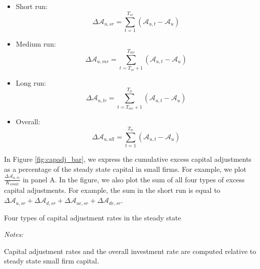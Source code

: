\documentclass[11pt,english]{article}
\newcommand*{\TabDir}{../tables}
\begin{document}
\begin{itemize}
\item Short run:
\begin{equation*}
\Delta \mathcal{A}_{u,sr} = \sum_{t=1}^{T_{sr}} \left( \mathcal{A}_{u,t} -  \mathcal{A}_{u}  \right)
\end{equation*}
\item Medium run:
\begin{equation*}
\Delta \mathcal{A}_{u,mr} = \sum_{t=T_{sr}+1}^{T_{mr}} \left( \mathcal{A}_{u,t} -  \mathcal{A}_{u}  \right)
\end{equation*}
\item Long run:
\begin{equation*}
\Delta \mathcal{A}_{u,lr} = \sum_{t=T_{mr}+1}^{T_{lr}} \left( \mathcal{A}_{u,t} -  \mathcal{A}_{u}  \right)
\end{equation*}
\item Overall:
\begin{equation*}
\Delta \mathcal{A}_{u,all} = \sum_{t=1}^{T_{lr}} \left( \mathcal{A}_{u,t} -  \mathcal{A}_{u}  \right)
\end{equation*}
\end{itemize}
In Figure \ref{fig:capadj_bar}, we express the cumulative excess capital adjustments as a percentage of the steady state capital in small firms. For example, we plot $\frac{\Delta \mathcal{A}_{u,sr}}{K_{small}}$ in panel A. In the figure, we also plot the sum of all four types of excess capital adjustments. For example, the sum in the short run is equal to $\Delta \mathcal{A}_{u,sr} + \Delta \mathcal{A}_{d,sr} +\Delta \mathcal{A}_{ue,sr} +\Delta \mathcal{A}_{de,sr}$.

\begin{table}[htbp]
	\caption{Four types of capital adjustment rates in the steady state}
   	\label{tab:capadj_ss}
   	\centering
   	
   	\vspace{1ex}
   	
   	{\textit{Notes:} \raggedright  Capital adjustment rates and the overall investment rate are computed relative to steady state small firm capital. 
   	\par}
\end{table}
\end{document}
